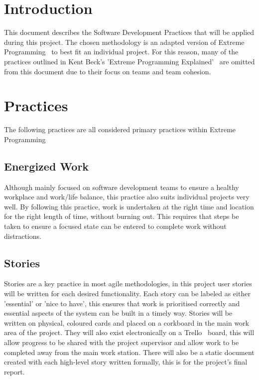 \documentclass[11pt,fleqn,twoside]{article}
\begin{document}
	
\wordcount{}
\mmp

\section{Introduction} \label{introduction_ref}
This document describes the Software Development Practices that will be applied during this project. The chosen methodology is an adapted version of Extreme Programming~\cite{xp_applied_ref, xp_explained_ref} to best fit an individual project. For this reason, many of the practices outlined in Kent Beck's 'Extreme Programming Explained'~\cite{xp_explained_ref} are omitted from this document due to their focus on teams and team cohesion.

\section{Practices} \label{practices_ref}
The following practices are all considered primary practices within Extreme Programming~\cite[Ch.~7]{xp_explained_ref}

\subsection{Energized Work}
Although mainly focused on software development teams to ensure a healthy workplace and work/life balance, this practice also suits individual projects very well. By following this practice, work is undertaken at the right time and location for the right length of time, without burning out. This requires that steps be taken to ensure a focused state can be entered to complete work without distractions. 

\subsection{Stories}
Stories are a key practice in most agile methodologies, in this project user stories will be written for each desired functionality. Each story can be labeled as either 'essential' or 'nice to have', this ensures that work is prioritised correctly and essential aspects of the system can be built in a timely way. Stories will be written on physical, coloured cards and placed on a corkboard in the main work area of the project. They will also exist electronically on a Trello~\cite{ref_trello} board, this will allow progress to be shared with the project supervisor and allow work to be completed away from the main work station. There will also be a static document created with each high-level story written formally, this is for the project's final report.
\end{document}
